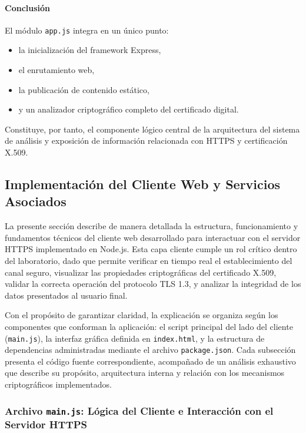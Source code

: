 \paragraph{Conclusión}
El módulo \texttt{app.js} integra en un único punto:
\begin{itemize}
  \item la inicialización del framework Express,
  \item el enrutamiento web,
  \item la publicación de contenido estático,
  \item y un analizador criptográfico completo del certificado digital.
\end{itemize}

Constituye, por tanto, el componente lógico central de la arquitectura del sistema de análisis y exposición de información relacionada con HTTPS y certificación X.509.

\subsection{Implementación del Cliente Web y Servicios Asociados}

La presente sección describe de manera detallada la estructura, funcionamiento y fundamentos técnicos del cliente web desarrollado para interactuar con el servidor HTTPS implementado en Node.js. Esta capa cliente cumple un rol crítico dentro del laboratorio, dado que permite verificar en tiempo real el establecimiento del canal seguro, visualizar las propiedades criptográficas del certificado X.509, validar la correcta operación del protocolo TLS 1.3, y analizar la integridad de los datos presentados al usuario final.

Con el propósito de garantizar claridad, la explicación se organiza según los componentes que conforman la aplicación: el script principal del lado del cliente (\texttt{main.js}), la interfaz gráfica definida en \texttt{index.html}, y la estructura de dependencias administradas mediante el archivo \texttt{package.json}. Cada subsección presenta el código fuente correspondiente, acompañado de un análisis exhaustivo que describe su propósito, arquitectura interna y relación con los mecanismos criptográficos implementados.

\subsubsection{Archivo \texttt{main.js}: Lógica del Cliente e Interacción con el Servidor HTTPS}

